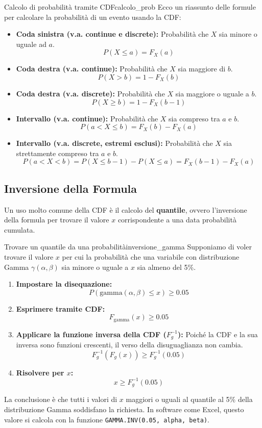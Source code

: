 \begin{nota}{Calcolo di probabilità tramite CDF}{calcolo_prob}
Ecco un riassunto delle formule per calcolare la probabilità di un evento usando la CDF:
\begin{itemize}
    \item \textbf{Coda sinistra (v.a. continue e discrete):} Probabilità che \( X \) sia minore o uguale ad \( a \).
    \[ P(X \le a) = F_X(a) \]
    \item \textbf{Coda destra (v.a. continue):} Probabilità che \( X \) sia maggiore di \( b \).
    \[ P(X > b) = 1 - F_X(b) \]
    \item \textbf{Coda destra (v.a. discrete):} Probabilità che \( X \) sia maggiore o uguale a \( b \).
    \[ P(X \ge b) = 1 - F_X(b-1) \]
    \item \textbf{Intervallo (v.a. continue):} Probabilità che \( X \) sia compreso tra \( a \) e \( b \).
    \[ P(a < X \le b) = F_X(b) - F_X(a) \]
    \item \textbf{Intervallo (v.a. discrete, estremi esclusi):} Probabilità che \( X \) sia strettamente compreso tra \( a \) e \( b \).
    \[ P(a < X < b) = P(X \le b-1) - P(X \le a) = F_X(b-1) - F_X(a) \]
\end{itemize}
\end{nota}

\subsection{Inversione della Formula}\label{ssec:inversione}

Un uso molto comune della CDF è il calcolo del \textbf{quantile}, ovvero l'inversione della formula per trovare il valore \( x \) corrispondente a una data probabilità cumulata.

\begin{esempio}{Trovare un quantile da una probabilità}{inversione_gamma}
Supponiamo di voler trovare il valore \( x \) per cui la probabilità che una variabile con distribuzione Gamma \( \gamma(\alpha, \beta) \) sia minore o uguale a \( x \) sia almeno del 5\%.
\begin{enumerate}
    \item \textbf{Impostare la disequazione:}
    \[
    P(\text{gamma}(\alpha, \beta) \le x) \ge 0.05
    \]
    \item \textbf{Esprimere tramite CDF:}
    \[
    F_{\text{gamma}}(x) \ge 0.05
    \]
    \item \textbf{Applicare la funzione inversa della CDF ($F_g^{-1}$):} Poiché la CDF e la sua inversa sono funzioni crescenti, il verso della disuguaglianza non cambia.
    \[
    F_g^{-1}(F_g(x)) \ge F_g^{-1}(0.05)
    \]
    \item \textbf{Risolvere per \(x\):}
    \[
    x \ge F_g^{-1}(0.05)
    \]
\end{enumerate}
La conclusione è che tutti i valori di \( x \) maggiori o uguali al quantile al 5\% della distribuzione Gamma soddisfano la richiesta. In software come Excel, questo valore si calcola con la funzione \texttt{GAMMA.INV(0.05, alpha, beta)}.
\end{esempio}

